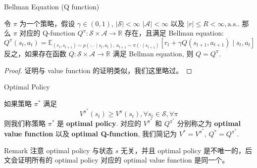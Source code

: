 \documentclass[aspectratio=169]{beamer}
\begin{document}
\begin{frame}{Bellman Equation (Q function)}
    \begin{theorem}
        令 $\pi$ 为一个策略，假设 $\gamma\in(0,1)$, $|\mathcal{S}|<\infty$ $|\mathcal{A}|<\infty$ 以及 $|r|\leq R<\infty, \mathrm{a.s.}$. 
        那么 $\pi$ 对应的 Q-function $Q^\pi:\mathcal{S}\times\mathcal{A}\to\mathbb{R}$ 存在，且满足 Bellman equation:
        \begin{equation}
            Q^\pi(s_t, a_t) = \mathbb{E}_{(r_t,s_{t+1})\sim p(\cdot,\cdot\mid s_t,a_t),\ a_{t+1}\sim \pi(\cdot\mid s_{t+1})}\left[r_t+\gamma Q(s_{t+1}, a_{t+1})\mid s_t, a_t\right]
        \end{equation}
        反之，如果存在函数 $Q:\mathcal{S}\times\mathcal{A}\to\mathbb{R}$ 满足 Bellman equation, 则 $Q=Q^\pi$.
    \end{theorem}
    \begin{proof}
        证明与 value function 的证明类似，我们这里略过。
    \end{proof}
\end{frame}

\begin{frame}{Optimal Policy}
    \begin{definition}
        如果策略 $\pi^*$ 满足
        \begin{equation}
            V^{\pi^*}(s_t)\geq V^{\pi}(s_t), \forall s_t\in\mathcal{S}, \forall \pi
        \end{equation}
        则我们称策略 $\pi^*$ 是 \textbf{optimal policy}. 
        对应的 $V^{\pi^*}$ 和 $Q^{\pi^*}$ 分别称之为 \textbf{optimal value function} 以及 \textbf{optimal Q-function}, 我们简记为 $V^*=V^{\pi^*}$, $Q^*=Q^{\pi^*}$.
    \end{definition}
    \begin{block}{Remark}
        注意 optimal policy 与状态 $s$ 无关，并且 optimal policy 是不唯一的，后文会证明所有的 optimal policy 对应的 optimal value function 是同一个。
    \end{block}
\end{frame}
\end{document}
